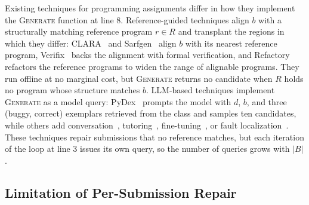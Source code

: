 \documentclass[acmsmall,screen,review,anonymous,nonacm]{acmart}
\newcommand{\Fn}[1]{\textsc{#1}}
\begin{document}
Existing techniques for programming assignments differ in how they implement the \Fn{Generate} function at line 8. Reference-guided techniques align $b$ with a structurally matching reference program $r \in R$ and transplant the regions in which they differ: CLARA~\cite{gulwani2018automated} and Sarfgen~\cite{wang2018search} align $b$ with its nearest reference program, Verifix~\cite{ahmed2022verifix} backs the alignment with formal verification, and Refactory~\cite{hu2019re} refactors the reference programs to widen the range of alignable programs. They run offline at no marginal cost, but \Fn{Generate} returns no candidate when $R$ holds no program whose structure matches $b$. LLM-based techniques implement \Fn{Generate} as a model query: PyDex~\cite{zhang2024pydex} prompts the model with $d$, $b$, and three (buggy, correct) exemplars retrieved from the class and samples ten candidates, while others add conversation~\cite{xia2024automated}, tutoring~\cite{yang2024cref}, fine-tuning~\cite{liu2024fastfixer,yang2026morepair}, or fault localization~\cite{orvalho2025counterexample,orvalho2025mentor}. These techniques repair submissions that no reference matches, but each iteration of the loop at line 3 issues its own query, so the number of queries grows with $|B|$.

\subsection{Limitation of Per-Submission Repair}
\label{sec:limit}
\end{document}
